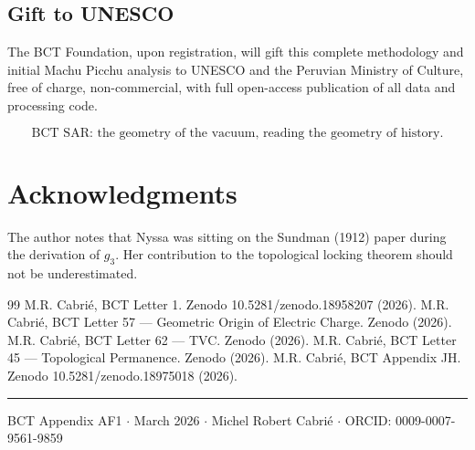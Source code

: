 \documentclass[twocolumn,10pt]{article}
\begin{document}
\subsection{Gift to UNESCO}

The BCT Foundation, upon registration, will gift this complete methodology and initial
Machu Picchu analysis to UNESCO and the Peruvian Ministry of Culture, free of charge,
non-commercial, with full open-access publication of all data and processing code.

\begin{equation*}
\text{BCT SAR: the geometry of the vacuum, reading the geometry of history.}
\end{equation*}

\section*{Acknowledgments}
The author notes that Nyssa was sitting on the Sundman (1912) paper during the derivation
of $g_3$. Her contribution to the topological locking theorem should not be underestimated.

\begin{thebibliography}{99}
 M.R. Cabri\'{e}, BCT Letter 1. Zenodo 10.5281/zenodo.18958207 (2026).
 M.R. Cabri\'{e}, BCT Letter 57 --- Geometric Origin of Electric Charge. Zenodo (2026).
 M.R. Cabri\'{e}, BCT Letter 62 --- TVC. Zenodo (2026).
 M.R. Cabri\'{e}, BCT Letter 45 --- Topological Permanence. Zenodo (2026).
 M.R. Cabri\'{e}, BCT Appendix JH. Zenodo 10.5281/zenodo.18975018 (2026).
\end{thebibliography}

\vspace{8pt}
\noindent\rule{\linewidth}{0.4pt}
\small BCT Appendix AF1 $\cdot$ March 2026 $\cdot$ Michel Robert Cabri\'{e} 
$\cdot$ ORCID: 0009-0007-9561-9859
\end{document}
